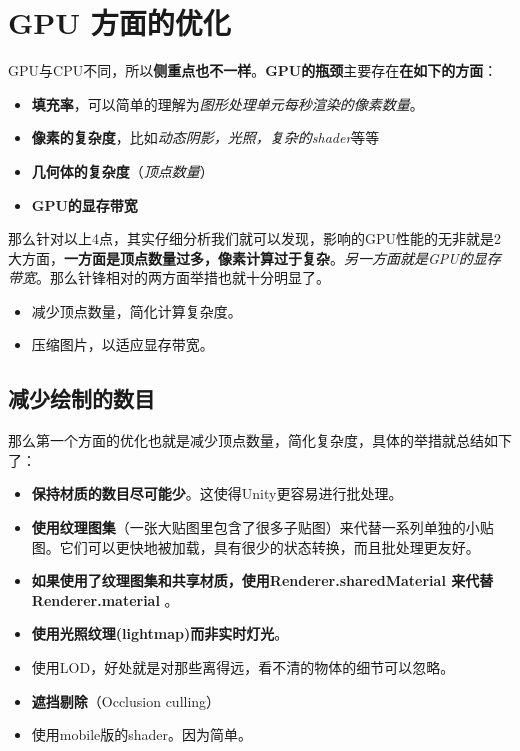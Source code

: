 \documentclass[UTF8,a4paper,12pt]{ctexart}
\begin{document}
  \section{GPU 方面的优化}
  		GPU与CPU不同，所以\textbf{侧重点也不一样}。\textbf{GPU的瓶颈}主要存在\textbf{在如下的方面}：
  			\begin{itemize}
  				\item \textbf{填充率}，可以简单的理解为\textit{图形处理单元每秒渲染的像素数量}。
  				\item \textbf{像素的复杂度}，比如\textit{动态阴影，光照，复杂的shader}等等
  				\item \textbf{几何体的复杂度}（\textit{顶点数量}）
  				\item \textbf{GPU的显存带宽}
  			\end{itemize}

  		那么针对以上4点，其实仔细分析我们就可以发现，影响的GPU性能的无非就是2大方面，\textbf{一方面是顶点数量过多，像素计算过于复杂}。\textit{另一方面就是GPU的显存带宽}。那么针锋相对的两方面举措也就十分明显了。
  			\begin{itemize}
  				\item 减少顶点数量，简化计算复杂度。
  				\item 压缩图片，以适应显存带宽。
  			\end{itemize}
  		
  		\subsection{减少绘制的数目}
  			那么第一个方面的优化也就是减少顶点数量，简化复杂度，具体的举措就总结如下了：
  			
  			\begin{itemize}
  				\item \textbf{保持材质的数目尽可能少}。这使得Unity更容易进行批处理。
  				\item \textbf{使用纹理图集}（一张大贴图里包含了很多子贴图）来代替一系列单独的小贴图。它们可以更快地被加载，具有很少的状态转换，而且批处理更友好。
  				\item \textbf{如果使用了纹理图集和共享材质，使用Renderer.sharedMaterial 来代替Renderer.material} 。
  				\item \textbf{使用光照纹理(lightmap)而非实时灯光}。
  				\item 使用LOD，好处就是对那些离得远，看不清的物体的细节可以忽略。
  				\item \textbf{遮挡剔除}（Occlusion culling）
  				\item 使用mobile版的shader。因为简单。
  			\end{itemize}
  			
\end{document}
